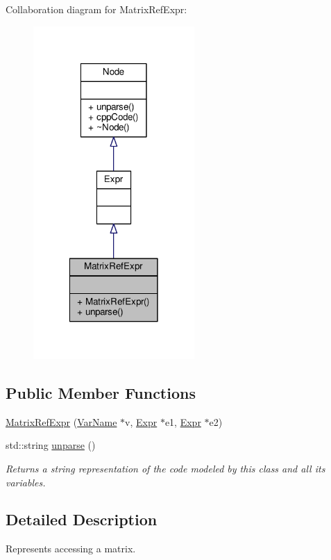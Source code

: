 Collaboration diagram for Matrix\-Ref\-Expr\-:\nopagebreak
\begin{figure}[H]
\begin{center}
\leavevmode
\includegraphics[width=174pt]{classMatrixRefExpr__coll__graph}
\end{center}
\end{figure}
\subsection*{Public Member Functions}
\begin{DoxyCompactItemize}
\item 
\hyperlink{classMatrixRefExpr_a70075a049a62f4115f9964206ca3da1e}{Matrix\-Ref\-Expr} (\hyperlink{classVarName}{Var\-Name} $\ast$v, \hyperlink{classExpr}{Expr} $\ast$e1, \hyperlink{classExpr}{Expr} $\ast$e2)
\item 
std\-::string \hyperlink{classMatrixRefExpr_ae1026da77ca12726f14e2f61656a22d8}{unparse} ()
\begin{DoxyCompactList}\small\item\em Returns a string representation of the code modeled by this class and all its variables. \end{DoxyCompactList}\end{DoxyCompactItemize}


\subsection{Detailed Description}
Represents accessing a matrix. \par
 

